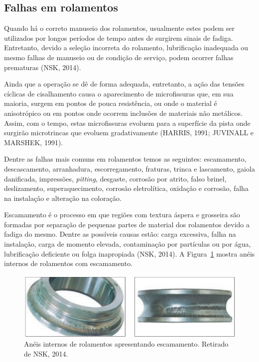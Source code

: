 \documentclass[
	12pt,				
	oneside,			
	a4paper,			
	english,			
	brazil,			
	]{abntex2ppgsi}
\begin{document}
\subsection{\textbf{Falhas em rolamentos}}

Quando há o correto manuseio dos rolamentos, usualmente estes podem ser utilizados por longos períodos de tempo antes de surgirem sinais de fadiga. Entretanto, devido a seleção incorreta do rolamento, lubrificação inadequada ou mesmo falhas de manuseio ou de condição de serviço, podem ocorrer falhas prematuras (NSK, 2014).

Ainda que a operação se dê de forma adequada, entretanto, a ação das tensões cíclicas de cisalhamento causa o aparecimento de microfissuras que, em sua maioria, surgem em pontos de pouca resistência, ou onde o material é anisotrópico  ou em pontos onde ocorrem inclusões de materiais não metálicos. Assim, com o tempo, estas microfissuras evoluem para a superfície da pista onde surgirão microtrincas que evoluem gradativamente (HARRIS, 1991; JUVINALL e MARSHEK, 1991).

Dentre as falhas mais comuns em rolamentos temos as seguintes: escamamento, descascamento, arranhadura, escorregamento, fraturas, trinca e lascamento, gaiola danificada, impressões, \textit{pitting}, desgaste, corrosão por atrito, falso brinel, deslizamento, superaquecimento, corrosão eletrolítica, oxidação e corrosão, falha na instalação e alteração na coloração.


Escamamento é o processo em que regiões com textura áspera e grosseira são formadas por separação de pequenas partes de material dos rolamentos devido a fadiga do mesmo. Dentre as possíveis causas estão: carga excessiva, falha na instalação, carga de momento elevada, contaminação por partículas ou por água, lubrificação deficiente ou folga inapropiada (NSK, 2014). A Figura~\ref{escamemento_nsk} mostra anéis internos de rolamentos com escamamento. 

\begin{figure}[H]
\centering
\includegraphics[width=\textwidth,height=\textheight,keepaspectratio]{escamamento_nsk}
\caption {Anéis internos de rolamentos apresentando escamamento. Retirado de NSK, 2014.}
\label{escamemento_nsk}
\end{figure}
\end{document}
